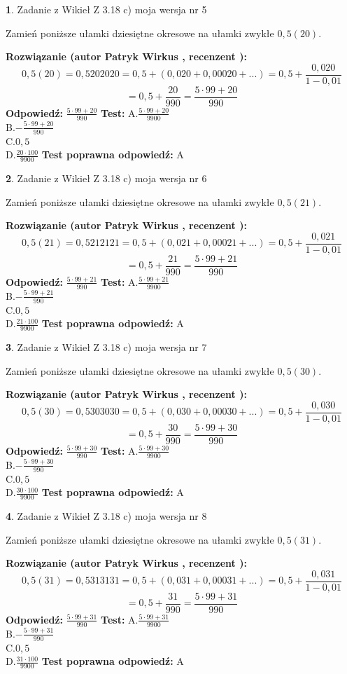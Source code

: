 \documentclass[12pt, a4paper]{article}
\theoremstyle{definition} %
\newtheorem{zad}{}
\newcommand{\zadStart}[1]{\begin{zad}#1\newline}
\newcommand{\zadStop}{\end{zad}}
\newcommand{\rozwStart}[2]{\noindent \textbf{Rozwiązanie (autor #1 , recenzent #2): }\newline}
\newcommand{\rozwStop}{\newline}
\newcommand{\odpStart}{\noindent \textbf{Odpowiedź:}\newline}
\newcommand{\odpStop}{\newline}
\newcommand{\testStart}{\noindent \textbf{Test:}\newline}
\newcommand{\testStop}{\newline}
\newcommand{\kluczStart}{\noindent \textbf{Test poprawna odpowiedź:}\newline}
\newcommand{\kluczStop}{\newline}
\begin{document}
\zadStart{Zadanie z Wikieł Z 3.18 c) moja wersja nr 5}

Zamień poniższe ułamki dziesiętne okresowe na ułamki zwykłe $0,5(20)$.
\zadStop
\rozwStart{Patryk Wirkus}{}
$$0,5(20)=0,5202020=0,5+(0,020+0,00020+...)=0,5+\frac{0,020}{1-0,01}$$
$$=0,5+\frac{20}{990}=\frac{5\cdot99+20}{990}$$
\rozwStop
\odpStart
$\frac{5\cdot99+20}{990}$
\odpStop
\testStart
A.$\frac{5\cdot99+20}{9900}$\\ B.$-\frac{5\cdot99+20}{990}$\\ C.$0,5$\\ D.$\frac{20\cdot100}{9900}$
\testStop
\kluczStart
A
\kluczStop



\zadStart{Zadanie z Wikieł Z 3.18 c) moja wersja nr 6}

Zamień poniższe ułamki dziesiętne okresowe na ułamki zwykłe $0,5(21)$.
\zadStop
\rozwStart{Patryk Wirkus}{}
$$0,5(21)=0,5212121=0,5+(0,021+0,00021+...)=0,5+\frac{0,021}{1-0,01}$$
$$=0,5+\frac{21}{990}=\frac{5\cdot99+21}{990}$$
\rozwStop
\odpStart
$\frac{5\cdot99+21}{990}$
\odpStop
\testStart
A.$\frac{5\cdot99+21}{9900}$\\ B.$-\frac{5\cdot99+21}{990}$\\ C.$0,5$\\ D.$\frac{21\cdot100}{9900}$
\testStop
\kluczStart
A
\kluczStop



\zadStart{Zadanie z Wikieł Z 3.18 c) moja wersja nr 7}

Zamień poniższe ułamki dziesiętne okresowe na ułamki zwykłe $0,5(30)$.
\zadStop
\rozwStart{Patryk Wirkus}{}
$$0,5(30)=0,5303030=0,5+(0,030+0,00030+...)=0,5+\frac{0,030}{1-0,01}$$
$$=0,5+\frac{30}{990}=\frac{5\cdot99+30}{990}$$
\rozwStop
\odpStart
$\frac{5\cdot99+30}{990}$
\odpStop
\testStart
A.$\frac{5\cdot99+30}{9900}$\\ B.$-\frac{5\cdot99+30}{990}$\\ C.$0,5$\\ D.$\frac{30\cdot100}{9900}$
\testStop
\kluczStart
A
\kluczStop



\zadStart{Zadanie z Wikieł Z 3.18 c) moja wersja nr 8}

Zamień poniższe ułamki dziesiętne okresowe na ułamki zwykłe $0,5(31)$.
\zadStop
\rozwStart{Patryk Wirkus}{}
$$0,5(31)=0,5313131=0,5+(0,031+0,00031+...)=0,5+\frac{0,031}{1-0,01}$$
$$=0,5+\frac{31}{990}=\frac{5\cdot99+31}{990}$$
\rozwStop
\odpStart
$\frac{5\cdot99+31}{990}$
\odpStop
\testStart
A.$\frac{5\cdot99+31}{9900}$\\ B.$-\frac{5\cdot99+31}{990}$\\ C.$0,5$\\ D.$\frac{31\cdot100}{9900}$
\testStop
\kluczStart
A
\kluczStop
\end{document}
